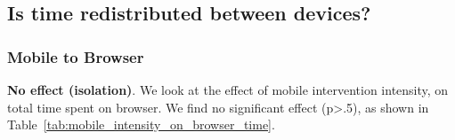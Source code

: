 










\subsection{Is time redistributed between devices?}

\subsubsection{Mobile to Browser}

\textbf{No effect (isolation)}. We look at the effect of mobile intervention intensity, on total time spent on browser. We find no significant effect (p>.5), as shown in Table~\ref{tab:mobile_intensity_on_browser_time}. %


